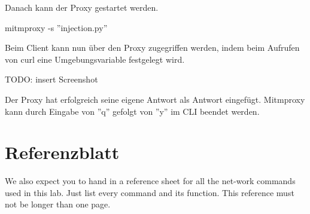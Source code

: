 \documentclass[11pt,titlepage]{article}
\newenvironment{shadedquotation}
 {\begin{shaded*}
  \quoting[leftmargin=0pt, vskip=0pt]
 }
 {\endquoting
 \end{shaded*}
}
\begin{document}
Danach kann der Proxy gestartet werden.
\begin{shadedquotation}
	mitmproxy -s ''injection.py''
\end{shadedquotation}

Beim Client kann nun über den Proxy zugegriffen werden, indem beim Aufrufen von curl eine Umgebungsvariable festgelegt wird.

TODO: insert Screenshot

Der Proxy hat erfolgreich seine eigene Antwort als Antwort eingefügt.
Mitmproxy kann durch Eingabe von ''q'' gefolgt von ''y'' im CLI beendet werden.
\newpage
\section{Referenzblatt}
\label{sec:Referenzblatt}
\begin{shadedquotation}
  We also expect you to hand in a reference sheet for all the net-work commands used in this lab. Just list every command and its function. This reference must not be longer than one page.
\end{shadedquotation}

\par\medskip 
\end{document}
